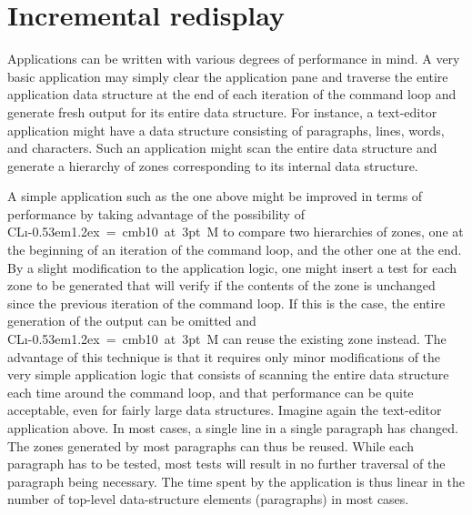 \documentclass{report}
\def\Tiny{ \font\Tinyfont = cmb10 at 3pt \relax  \Tinyfont}
\def\clim{\textsf{CL{\i}\kern-0.53em\raise1.2ex\hbox{\Tiny 3}M}}
\begin{document}
\section{Incremental redisplay}

Applications can be written with various degrees of performance in
mind.  A very basic application may simply clear the application pane
and traverse the entire application data structure at the end of each
iteration of the command loop and generate fresh output for its entire
data structure.  For instance, a text-editor application might have a
data structure consisting of paragraphs, lines, words, and characters.
Such an application might scan the entire data structure and generate
a hierarchy of zones corresponding to its internal data structure. 

A simple application such as the one above might be improved in terms
of performance by taking advantage of the possibility of \clim{} to
compare two hierarchies of zones, one at the beginning of an
iteration of the command loop, and the other one at the end.  By
a slight modification to the application logic, one might insert a
test for each zone to be generated that will verify if the contents
of the zone is unchanged since the previous iteration of the command
loop.  If this is the case, the entire generation of the output can be
omitted and \clim{} can reuse the existing zone instead.  The
advantage of this technique is that it requires only minor
modifications of the very simple application logic that consists of
scanning the entire data structure each time around the command loop,
and that performance can be quite acceptable, even for fairly large
data structures.  Imagine again the text-editor application above.  In
most cases, a single line in a single paragraph has changed.  The
zones generated by most paragraphs can thus be reused.  While each
paragraph has to be tested, most tests will result in no further
traversal of the paragraph being necessary.  The time spent by the
application is thus linear in the number of top-level data-structure
elements (paragraphs) in most cases.  
\end{document}
